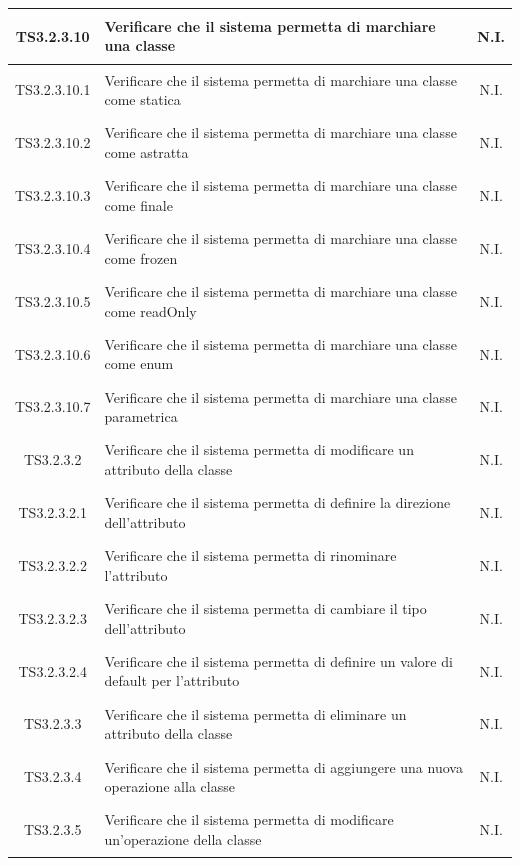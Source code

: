 \documentclass[../PianoDiQualifica.tex]{subfiles}
\begin{document}
\begin{longtable}{|c|>{\centering}p{10cm}|c|}
	\hline
	\hypertarget{TS3.2.3.10}{TS3.2.3.10} & Verificare che il sistema permetta di marchiare una classe & N.I. \\
	\hline
	\hypertarget{TS3.2.3.10.1}{TS3.2.3.10.1} & Verificare che il sistema permetta di marchiare una classe come statica & N.I. \\
	\hline
	\hypertarget{TS3.2.3.10.2}{TS3.2.3.10.2} & Verificare che il sistema permetta di marchiare una classe come astratta & N.I. \\
	\hline
	\hypertarget{TS3.2.3.10.3}{TS3.2.3.10.3} & Verificare che il sistema permetta di marchiare una classe come finale & N.I. \\
	\hline
	\hypertarget{TS3.2.3.10.4}{TS3.2.3.10.4} & Verificare che il sistema permetta di marchiare una classe come frozen & N.I. \\
	\hline
	\hypertarget{TS3.2.3.10.5}{TS3.2.3.10.5} & Verificare che il sistema permetta di marchiare una classe come readOnly & N.I. \\
	\hline
	\hypertarget{TS3.2.3.10.6}{TS3.2.3.10.6} & Verificare che il sistema permetta di marchiare una classe come enum & N.I. \\
	\hline
	\hypertarget{TS3.2.3.10.7}{TS3.2.3.10.7} & Verificare che il sistema permetta di marchiare una classe parametrica & N.I. \\
	\hline
	\hypertarget{TS3.2.3.2}{TS3.2.3.2} & Verificare che il sistema permetta di modificare un attributo della classe & N.I. \\
	\hline
	\hypertarget{TS3.2.3.2.1}{TS3.2.3.2.1} & Verificare che il sistema permetta di definire la direzione dell'attributo & N.I. \\
	\hline
	\hypertarget{TS3.2.3.2.2}{TS3.2.3.2.2} & Verificare che il sistema permetta di rinominare l'attributo & N.I. \\
	\hline
	\hypertarget{TS3.2.3.2.3}{TS3.2.3.2.3} & Verificare che il sistema permetta di cambiare il tipo dell'attributo & N.I. \\
	\hline
	\hypertarget{TS3.2.3.2.4}{TS3.2.3.2.4} & Verificare che il sistema permetta di definire un valore di default per l'attributo & N.I. \\
	\hline
	\hypertarget{TS3.2.3.3}{TS3.2.3.3} & Verificare che il sistema permetta di eliminare un attributo della classe & N.I. \\
	\hline
	\hypertarget{TS3.2.3.4}{TS3.2.3.4} & Verificare che il sistema permetta di aggiungere una nuova operazione alla classe & N.I. \\
	\hline
	\hypertarget{TS3.2.3.5}{TS3.2.3.5} & Verificare che il sistema permetta di modificare un'operazione della classe & N.I. \\

\end{longtable}
\end{document}
